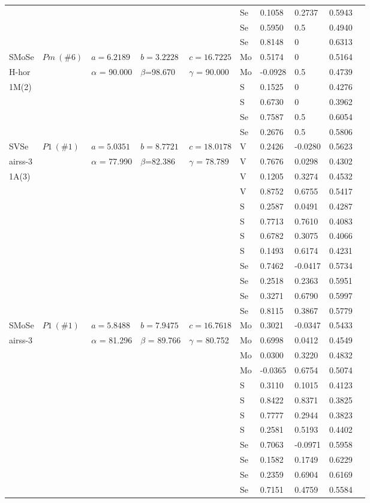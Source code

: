 \documentclass[a4paperm]{article}
\begin{document}
\begin{table}[H]
\begin{tabular}{l*{9}{l}}
		&&&&&	Se	&	0.1058	&	0.2737	&	0.5943	\\
		&&&&&	Se	&	0.5950	&	0.5		&	0.4940	\\
		&&&&&	Se	&	0.8148	&	0		&	0.6313	\\
		\hline 
		SMoSe & $Pm\ (\#6)$  &	$a=6.2189$ & $b=3.2228$ & $c=16.7225$  & Mo	&	0.5174	&	0	&	0.5164	\\
		H-hor&   &$\alpha$ = 90.000& $\beta$=98.670& $\gamma$ = 90.000& Mo	&	-0.0928	&	0.5	&	0.4739	\\
		1M(2)&&&&& S	&	0.1525	&	0	&	0.4276	\\
		&&&&& S	&	0.6730	&	0	&	0.3962	\\
		&&&&& Se	&	0.7587	&	0.5	&	0.6054	\\
		&&&&& Se	&	0.2676	&	0.5	&	0.5806	\\
		\hline
		SVSe & $P1\ (\#1)$  &	$a=5.0351$ & $b=8.7721$ & $c=18.0178$  & V	&	0.2426	&	-0.0280	&	0.5623	\\
		airss-3&&$\alpha$ = 77.990& $\beta$=82.386& $\gamma$ = 78.789  & V	&	0.7676	&	0.0298	&	0.4302	\\		
		1A(3)&&&&&	V	&	0.1205	&	0.3274	&	0.4532	\\
		&&&&&	V	&	0.8752	&	0.6755	&	0.5417	\\
		&&&&&	S	&	0.2587	&	0.0491	&	0.4287	\\
		&&&&&	S	&	0.7713	&	0.7610	&	0.4083	\\
		&&&&&	S	&	0.6782	&	0.3075	&	0.4066	\\
		&&&&&	S	&	0.1493	&	0.6174	&	0.4231	\\
		&&&&&	Se	&	0.7462	&	-0.0417	&	0.5734	\\
		&&&&&	Se	&	0.2518	&	0.2363	&	0.5951	\\
		&&&&&	Se	&	0.3271	&	0.6790	&	0.5997	\\
		&&&&&	Se	&	0.8115	&	0.3867	&	0.5779	\\
		\hline
		SMoSe & $P1\ (\#1)$  &	$a=5.8488$ & $b=7.9475$ & $c=16.7618$  & Mo	&	0.3021	&	-0.0347	&	0.5433	\\
		airss-3&&$\alpha$ = 81.296& $\beta$ = 89.766& $\gamma$ = 80.752  & Mo	&	0.6998	&	0.0412	&	0.4549	\\		
		&&&&&	Mo	&	0.0300	&	0.3220	&	0.4832	\\
		&&&&&	Mo	&	-0.0365	&	0.6754	&	0.5074	\\
		&&&&&	S	&	0.3110	&	0.1015	&	0.4123	\\
		&&&&&	S	&	0.8422	&	0.8371	&	0.3825	\\
		&&&&&	S	&	0.7777	&	0.2944	&	0.3823	\\
		&&&&&	S	&	0.2581	&	0.5193	&	0.4402	\\
		&&&&&	Se	&	0.7063	&	-0.0971	&	0.5958	\\
		&&&&&	Se	&	0.1582	&	0.1749	&	0.6229	\\
		&&&&&	Se	&	0.2359	&	0.6904	&	0.6169	\\
		&&&&&	Se	&	0.7151	&	0.4759	&	0.5584	\\
		\hline
	\end{tabular}
\end{table}
\end{document}
